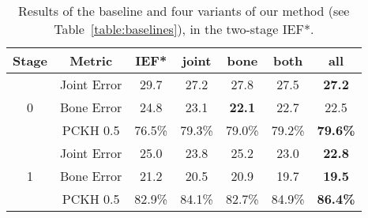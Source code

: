 \documentclass[10pt,twocolumn,letterpaper]{article}
\begin{document}
\begin{table}[t]
\centering
\footnotesize
\begin{tabular}{c|c|c|c|c|c|c}
\hline
Stage & Metric & IEF* & joint & bone & both & all\\
\hline \hline
\multirow{3}{*}{ 0}
& Joint Error   &29.7   &27.2   &27.8   			&27.5 	&\textbf{27.2}  \\
& Bone Error 	&24.8   &23.1   &\textbf{22.1}   	&22.7 	&22.5  \\
& PCKH 0.5 		&76.5\% &79.3\% &79.0\% 			&79.2\%	&\textbf{79.6\%}\\
\hline \hline
\multirow{3}{*}{ 1}
& Joint Error   &25.0   &23.8   &25.2   &23.0    &\textbf{22.8}   \\
& Bone Error	&21.2   &20.5   &20.9   &19.7    &\textbf{19.5}   \\
& PCKH 0.5 		&82.9\% &84.1\% &82.7\% &84.9\%  &\textbf{86.4\%} \\
\end{tabular}
\caption{Results of the baseline and four variants of our method (see Table~\ref{table:baselines}), in the two-stage IEF*.}
\label{table:mpii_ablation}
\end{table}
\end{document}
